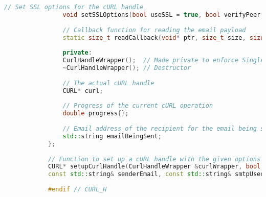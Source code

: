 \documentclass{article}
\begin{document}
\begin{mdframed}[backgroundcolor=background, hidealllines=false, innerleftmargin=15pt, innerrightmargin=5pt, innertopmargin=0pt, innerbottommargin=-5pt, linecolor=accent]
\begin{lstlisting}[language=C++]
				// Set SSL options for the cURL handle
				void setSSLOptions(bool useSSL = true, bool verifyPeer = true, bool verifyHost = true);
				
				// Callback function for reading the email payload
				static size_t readCallback(void* ptr, size_t size, size_t nmemb, void* userp);
				
				private:
				CurlHandleWrapper();  // Made private to enforce Singleton pattern
				~CurlHandleWrapper(); // Destructor
				
				// The actual cURL handle
				CURL* curl;
				
				// Progress of the current cURL operation
				double progress{};
				
				// Email address of the recipient for the email being sent
				std::string emailBeingSent;
			};
			
			// Function to set up a cURL handle with the given options
			CURL* setupCurlHandle(CurlHandleWrapper &curlWrapper, bool useSSL, bool verifyPeer, bool verifyHost, bool verbose,
			const std::string& senderEmail, const std::string& smtpUsername, std::string& mailPassDecrypted, int smtpPort, const std::string& smtpServer);
			
			#endif // CURL_H
			\end{lstlisting}
	\end{mdframed}
	
\end{document}
